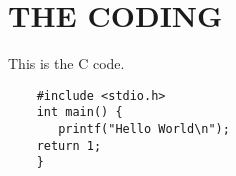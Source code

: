 \chapter{THE CODING}
\label{app:coding}

This is the C code.

\begin{verbatim}
    #include <stdio.h>
    int main() {
       printf("Hello World\n");
    return 1;
    }
\end{verbatim}

